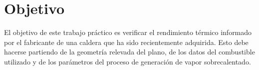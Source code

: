 \section{Objetivo}\label{sec:Objetivo}
El objetivo de este trabajo práctico es verificar el rendimiento térmico informado por el fabricante de una caldera que ha sido recientemente adquirida. Esto debe hacerse partiendo de la geometría relevada del plano, de los datos del combustible utilizado y de los parámetros del proceso de generación de vapor sobrecalentado.